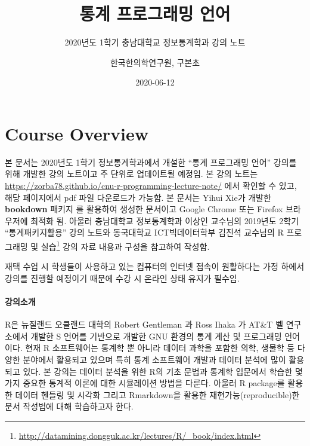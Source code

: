 \documentclass[
  11pt,
]{krantz}
\title{통계 프로그래밍 언어}
\subtitle{2020년도 1학기 충남대학교 정보통계학과 강의 노트}
\author{한국한의학연구원, 구본초}
\date{2020-06-12}
\makeatletter
\renewcommand{\href}[2]{#2\footnote{\url{#1}}}
\newenvironment{kframe}{%
\medskip{}
\setlength{\fboxsep}{.8em}
 \def\at@end@of@kframe{}%
 \ifinner\ifhmode%
  \def\at@end@of@kframe{\end{minipage}}%
  \begin{minipage}{\columnwidth}%
 \fi\fi%
 \def\FrameCommand##1{\hskip\@totalleftmargin \hskip-\fboxsep
 \colorbox{shadecolor}{##1}\hskip-\fboxsep
     \hskip-\linewidth \hskip-\@totalleftmargin \hskip\columnwidth}%
 \MakeFramed {\advance\hsize-\width
   \@totalleftmargin\z@ \linewidth\hsize
   \@setminipage}}%
 {\par\unskip\endMakeFramed%
 \at@end@of@kframe}
\newenvironment{rmdblock}[1]
  {
  \begin{itemize}
  \renewcommand{\labelitemi}{
    \raisebox{-.7\height}[0pt][0pt]{
      {\setkeys{Gin}{width=3em,keepaspectratio}\texttt{[image: images/\#1]}}
    }
  }
  \setlength{\fboxsep}{1em}
  \begin{kframe}
  \item
  }
  {
  \end{kframe}
  \end{itemize}
  }
\newenvironment{rmdnote}
  {\begin{rmdblock}{note}}
  {\end{rmdblock}}
\makeatother
\begin{document}
\maketitle

{
\hypersetup{linkcolor=}
\setcounter{tocdepth}{2}
\tableofcontents
}
\listoftables
\listoffigures
\hypertarget{overview}{%
\chapter*{Course Overview}\label{overview}}


\begin{rmdnote}
\begin{rmdnote}

본 문서는 2020년도 1학기 정보통계학과에서 개설한 ``통계 프로그래밍 언어'' 강의를 위해 개발한 강의 노트이고 주 단위로 업데이트될 예정임. 본 강의 노트는 \url{https://zorba78.github.io/cnu-r-programming-lecture-note/} 에서 확인할 수 있고, 해당 페이지에서 pdf 파일 다운로드가 가능함. 본 문서는 Yihui Xie가 개발한 \textbf{bookdown} 패키지 \citep{xie-2016}를 활용하여 생성한 문서이고 Google Chrome 또는 Firefox 브라우저에 최적화 됨. 아울러 충남대학교 정보통계학과 이상인 교수님의 2019년도 2학기 ``통계패키지활용'' 강의 노트와 동국대학교 ICT빅데이터학부 김진석 교수님의 \href{http://datamining.dongguk.ac.kr/lectures/R/_book/index.html}{R 프로그래밍 및 실습} 강의 자료 내용과 구성을 참고하여 작성함.

재택 수업 시 학생들이 사용하고 있는 컴퓨터의 인터넷 접속이 원활하다는 가정 하에서 강의를 진행할 예정이기 때문에 수강 시 온라인 상태 유지가 필수임.

\end{rmdnote}
\end{rmdnote}

\hypertarget{intro-lec}{%
\subsubsection*{강의소개}\label{intro-lec}}


R은 뉴질랜드 오클랜드 대학의 Robert Gentleman 과 Ross Ihaka 가 AT\&T 벨 연구소에서 개발한 S 언어를 기반으로 개발한 GNU 환경의 통계 계산 및 프로그래밍 언어이다. 현재 R 소프트웨어는 통계학 뿐 아니라 데이터 과학을 포함한 의학, 생물학 등 다양한 분야에서 활용되고 있으며 특히 통계 소프트웨어 개발과 데이터 분석에 많이 활용되고 있다. 본 강의는 데이터 분석을 위한 R의 기초 문법과 통계학 입문에서 학습한 몇 가지 중요한 통계적 이론에 대한 시뮬레이션 방법을 다룬다. 아울러 R package를 활용한 데이터 헨들링 및 시각화 그리고 Rmarkdown을 활용한 재현가능(reproducible)한 문서 작성법에 대해 학습하고자 한다.
\end{document}
